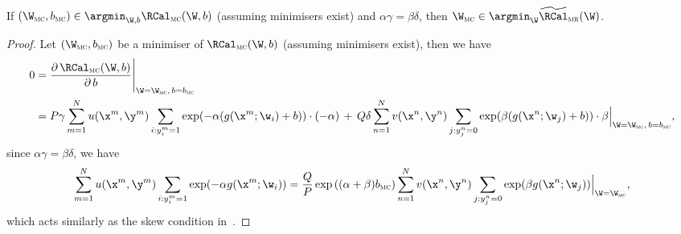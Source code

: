 \begin{theorem}
\label{theorem:mc2mr}
If $(\W_\textsc{mc}, b_\textsc{mc}) \in \argmin_{\W,b} \RCal_\textsc{mc}(\W, b)$ (assuming minimisers exist)
and $\alpha \gamma = \beta \delta$, then $\W_\textsc{mc} \in \argmin_\W \widetilde\RCal_\textsc{mr}(\W)$.
\end{theorem}


\begin{proof}
Let $(\W_\textsc{mc}, b_\textsc{mc})$ be a minimiser of $\RCal_\textsc{mc}(\W, b)$ (assuming minimisers exist),
then we have
\begin{equation*}
\begin{aligned}
0 
&= \frac{\partial \, \RCal_\textsc{mc}(\W, b)} {\partial \, b} \Bigg|_{\W = \W_\textsc{mc}, \, b = b_\textsc{mc}} \\
&= P \gamma \sum_{m=1}^N u(\x^m, \y^m) \sum_{i: y_i^m = 1} \exp(-\alpha (g(\x^m; \w_i) + b)) \cdot (-\alpha) \, + \,
   Q \delta \sum_{n=1}^N v(\x^n, \y^n) \sum_{j: y_j^n = 0} \exp( \beta  (g(\x^n; \w_j) + b)) \cdot \beta 
   \Big|_{\W = \W_\textsc{mc}, \, b = b_\textsc{mc}},
\end{aligned}
\end{equation*}
since $\alpha \gamma = \beta \delta$, we have
\begin{equation}
\label{eq:skew_ml}
  \sum_{m=1}^N u(\x^m, \y^m) \sum_{i: y_i^m = 1} \exp(-\alpha g(\x^m; \w_i)) 
= \frac{Q}{P} \exp \left((\alpha + \beta) b_\textsc{mc} \right) 
  \sum_{n=1}^N v(\x^n, \y^n) \sum_{j: y_j^n = 0} \exp( \beta  g(\x^n; \w_j)) 
  \Big|_{\W = \W_\textsc{mc}},
\end{equation}
which acts similarly as the skew condition in~\cite{ertekin2011equivalence}.


\end{proof}
